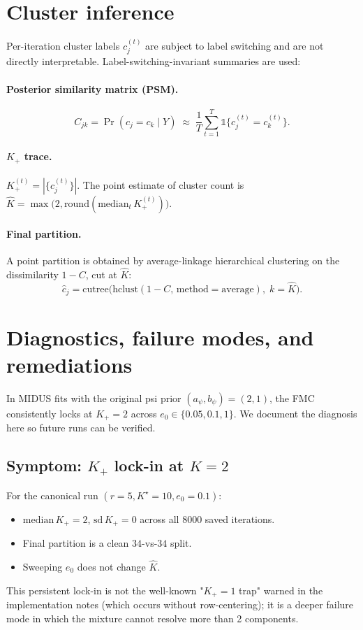 \documentclass[11pt]{article}
\begin{document}
\section{Cluster inference}\label{sec:cluster-inference}

Per-iteration cluster labels $c_j^{(t)}$ are subject to label switching and are not directly interpretable.
Label-switching-invariant summaries are used:

\paragraph{Posterior similarity matrix (PSM).}
\[
C_{jk}=\Pr(c_j=c_k\mid Y)\;\approx\;\frac{1}{T}\sum_{t=1}^T \mathbb{1}\{c_j^{(t)}=c_k^{(t)}\}.
\]

\paragraph{$K_+$ trace.}
$K_+^{(t)}=|\{c_j^{(t)}\}|$. The point estimate of cluster count is
\(
\hat K=\max\bigl(2,\mathrm{round}(\mathrm{median}_t\,K_+^{(t)})\bigr).
\)

\paragraph{Final partition.}
A point partition is obtained by average-linkage hierarchical clustering on the dissimilarity $1-C$, cut at $\hat K$:
\[
\hat c_j = \mathrm{cutree}\bigl(\mathrm{hclust}(1-C,\,\text{method}=\text{average}),\;k=\hat K\bigr).
\]

\section{Diagnostics, failure modes, and remediations}\label{sec:diagnostics}

In MIDUS fits with the original psi prior $(a_\psi,b_\psi)=(2,1)$, the FMC consistently locks at $K_+=2$ across $e_0\in\{0.05,0.1,1\}$. We document the diagnosis here so future runs can be verified.

\subsection{Symptom: $K_+$ lock-in at $K=2$}\label{sec:symptom}

For the canonical run $(r=5,K^\star=10,e_0=0.1)$:
\begin{itemize}[leftmargin=1.5em]
    \item $\mathrm{median}\,K_+ = 2$, $\mathrm{sd}\,K_+ = 0$ across all 8000 saved iterations.
    \item Final partition is a clean $34$-vs-$34$ split.
    \item Sweeping $e_0$ does not change $\hat K$.
\end{itemize}
This persistent lock-in is not the well-known "$K_+=1$ trap" warned in the implementation notes (which occurs without row-centering); it is a deeper failure mode in which the mixture cannot resolve more than 2 components.
\end{document}
